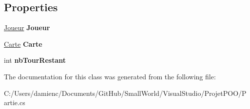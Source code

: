 \subsection*{Properties}
\begin{DoxyCompactItemize}
\item 
\hypertarget{class_small_world_1_1_partie_a204fb33757e7ab7d0427a3c37f938062}{\hyperlink{class_small_world_1_1_joueur}{Joueur} {\bfseries Joueur}}\label{class_small_world_1_1_partie_a204fb33757e7ab7d0427a3c37f938062}

\item 
\hypertarget{class_small_world_1_1_partie_a62ae701f7e4fa523001a6326c0033e6b}{\hyperlink{class_small_world_1_1_carte}{Carte} {\bfseries Carte}}\label{class_small_world_1_1_partie_a62ae701f7e4fa523001a6326c0033e6b}

\item 
\hypertarget{class_small_world_1_1_partie_a76f9f56c84f30004462e65de85cbd1e3}{int {\bfseries nb\-Tour\-Restant}}\label{class_small_world_1_1_partie_a76f9f56c84f30004462e65de85cbd1e3}

\end{DoxyCompactItemize}


The documentation for this class was generated from the following file\-:\begin{DoxyCompactItemize}
\item 
C\-:/\-Users/damienc/\-Documents/\-Git\-Hub/\-Small\-World/\-Visual\-Studio/\-Projet\-P\-O\-O/Partie.\-cs\end{DoxyCompactItemize}

